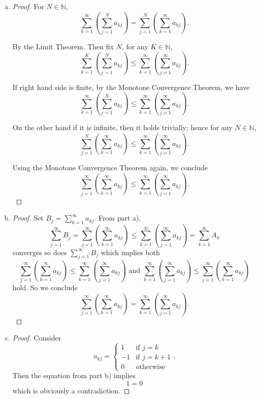 \begin{Exercise}
\begin{enumerate}[a)]
\item 
\begin{proof}
For $N\in\mathbb{N}$, 
$$ 
\sum_{k=1}^{\infty}\left( \sum_{j=1}^{N}a_{k j} \right) 
= \sum_{j=1}^{N}\left( \sum_{k=1}^{\infty}a_{k j} \right). 
$$ 

By the Limit Theorem. Then fix $N$, for any $K\in\mathbb{N}$, 
$$ 
\sum_{k=1}^{K}\left( \sum_{j=1}^{N}a_{k j} \right) 
\leq \sum_{k=1}^{\infty}\left( \sum_{j=1}^{\infty}a_{k j} \right).
$$

If right hand side is finite, by the Monotone Convergence Theorem, we have
$$
\sum_{k=1}^{\infty}\left( \sum_{j=1}^{N}a_{k j} \right) \leq \sum_{k=1}^{\infty}\left( \sum_{j=1}^{\infty}a_{k j} \right).
$$

On the other hand if it is infinite, then it holds trivially; hence for any $N\in\mathbb{N}$,
$$
\sum_{j=1}^{N}\left( \sum_{k=1}^{\infty}a_{k j} \right) \leq \sum_{k=1}^{\infty}\left( \sum_{j=1}^{\infty}a_{k j} \right).
$$ 

Using the Monotone Convergence Theorem again, we conclude
$$
\sum_{j=1}^{\infty}\left( \sum_{k=1}^{\infty}a_{k j} \right) 
\leq \sum_{k=1}^{\infty}\left( \sum_{j=1}^{\infty}a_{k j} \right).
$$
\end{proof}

\item
\begin{proof}
Set $B_j = \sum_{k=1}^{\infty}a_{k j}$. From part a), 
$$
\sum_{j=1}^{\infty}B_j 
= \sum_{j=1}^{\infty}\left( \sum_{k=1}^{\infty}a_{k j} \right) 
\leq \sum_{k=1}^{\infty}\left( \sum_{j=1}^{\infty}a_{k j} \right) 
= \sum_{k=1}^{\infty}A_k
$$ 
converges so does $\sum_{j=1}^{\infty}B_j$ which implies both 
$$
\sum_{j=1}^{\infty}\left( \sum_{k=1}^{\infty}a_{k j} \right) 
\leq \sum_{k=1}^{\infty}\left( \sum_{j=1}^{\infty}a_{k j} \right) \mbox{ and } \sum_{k=1}^{\infty}\left( \sum_{j=1}^{\infty}a_{k j} \right) 
\leq \sum_{j=1}^{\infty}\left( \sum_{k=1}^{\infty}a_{k j} \right) 
$$ 
hold. So we conclude 
$$
\sum_{j=1}^{\infty}\left( \sum_{k=1}^{\infty}a_{k j} \right) 
= \sum_{k=1}^{\infty}\left( \sum_{j=1}^{\infty}a_{k j} \right).
$$
\end{proof}

\item
\begin{proof}
Consider 
$$
a_{k j} = \begin{cases}
1 & \mbox{if } j=k \\
-1 & \mbox{if } j=k+1 \\
0 & \mbox{otherwise} 
\end{cases}.
$$
Then the equation from part b) implies
$$ 
1 = 0
$$
which is obviously a contradiction.
\end{proof}
\end{enumerate}
\end{Exercise}